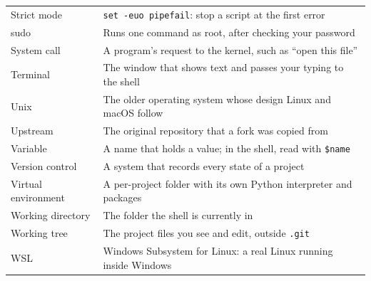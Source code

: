 \begin{booktable}
\begin{longtable}{>{\raggedright\arraybackslash}p{}>{\raggedright\arraybackslash}p{}}
Strict mode & \texttt{set\ -euo\ pipefail}: stop a script at the first error \\
sudo & Runs one command as root, after checking your password \\
System call & A program's request to the kernel, such as ``open this file'' \\
Terminal & The window that shows text and passes your typing to the shell \\
Unix & The older operating system whose design Linux and macOS follow \\
Upstream & The original repository that a fork was copied from \\
Variable & A name that holds a value; in the shell, read with \texttt{\$name} \\
Version control & A system that records every state of a project \\
Virtual environment & A per-project folder with its own Python interpreter and packages \\
Working directory & The folder the shell is currently in \\
Working tree & The project files you see and edit, outside \texttt{.git} \\
WSL & Windows Subsystem for Linux: a real Linux running inside Windows \\
\end{longtable}
\end{booktable}
